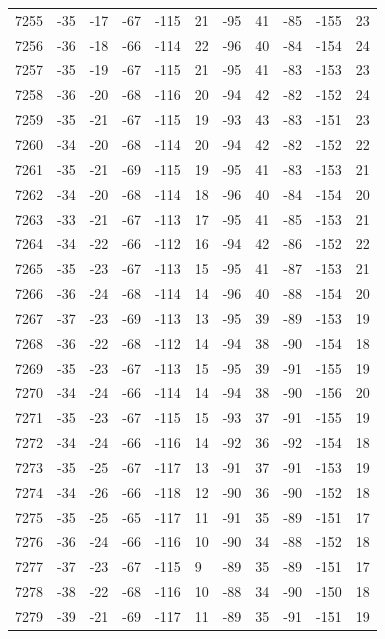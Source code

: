 \begin{table}[H]
\begin{tabular}{lllllllllll}
7255 & -35 & -17 & -67 & -115 & 21 & -95 & 41 & -85 & -155 & 23 \\
7256 & -36 & -18 & -66 & -114 & 22 & -96 & 40 & -84 & -154 & 24 \\
7257 & -35 & -19 & -67 & -115 & 21 & -95 & 41 & -83 & -153 & 23 \\
7258 & -36 & -20 & -68 & -116 & 20 & -94 & 42 & -82 & -152 & 24 \\
7259 & -35 & -21 & -67 & -115 & 19 & -93 & 43 & -83 & -151 & 23 \\
7260 & -34 & -20 & -68 & -114 & 20 & -94 & 42 & -82 & -152 & 22 \\
7261 & -35 & -21 & -69 & -115 & 19 & -95 & 41 & -83 & -153 & 21 \\
7262 & -34 & -20 & -68 & -114 & 18 & -96 & 40 & -84 & -154 & 20 \\
7263 & -33 & -21 & -67 & -113 & 17 & -95 & 41 & -85 & -153 & 21 \\
7264 & -34 & -22 & -66 & -112 & 16 & -94 & 42 & -86 & -152 & 22 \\
7265 & -35 & -23 & -67 & -113 & 15 & -95 & 41 & -87 & -153 & 21 \\
7266 & -36 & -24 & -68 & -114 & 14 & -96 & 40 & -88 & -154 & 20 \\
7267 & -37 & -23 & -69 & -113 & 13 & -95 & 39 & -89 & -153 & 19 \\
7268 & -36 & -22 & -68 & -112 & 14 & -94 & 38 & -90 & -154 & 18 \\
7269 & -35 & -23 & -67 & -113 & 15 & -95 & 39 & -91 & -155 & 19 \\
7270 & -34 & -24 & -66 & -114 & 14 & -94 & 38 & -90 & -156 & 20 \\
7271 & -35 & -23 & -67 & -115 & 15 & -93 & 37 & -91 & -155 & 19 \\
7272 & -34 & -24 & -66 & -116 & 14 & -92 & 36 & -92 & -154 & 18 \\
7273 & -35 & -25 & -67 & -117 & 13 & -91 & 37 & -91 & -153 & 19 \\
7274 & -34 & -26 & -66 & -118 & 12 & -90 & 36 & -90 & -152 & 18 \\
7275 & -35 & -25 & -65 & -117 & 11 & -91 & 35 & -89 & -151 & 17 \\
7276 & -36 & -24 & -66 & -116 & 10 & -90 & 34 & -88 & -152 & 18 \\
7277 & -37 & -23 & -67 & -115 & 9 & -89 & 35 & -89 & -151 & 17 \\
7278 & -38 & -22 & -68 & -116 & 10 & -88 & 34 & -90 & -150 & 18 \\
7279 & -39 & -21 & -69 & -117 & 11 & -89 & 35 & -91 & -151 & 19 \\

\end{tabular}
\end{table}
